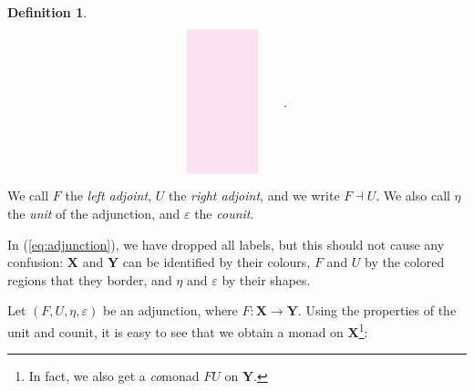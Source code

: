 \documentclass{article}
\numberwithin{equation}{section}
\theoremstyle{definition}
\newtheorem{definition}[theorem]{Definition}
\newcommand{\varcat}[1]{\mathbf{#1}}
\newcommand{\cX}{\varcat{X}}
\newcommand{\cY}{\varcat{Y}}
\begin{document}
\begin{definition}
\begin{equation}
\begin{aligned}
\begin{tikzpicture}[scale=2]
						\fill[very nearly transparent, magenta]									
						(1.5,-1) -- (1.5,-3) --(2.5,-3) -- (2.5,-1);							
					\end{tikzpicture}
				\end{aligned}									
				\qquad.
			\end{equation}
			We call $F$ the \emph{left adjoint}, $U$ the \emph{right adjoint}, and we write $F \dashv U$. We also call $\eta$ the \emph{unit} of the adjunction, and $\varepsilon$ the \emph{counit}.
		\end{definition}
		In (\ref{eq:adjunction}), we have dropped all labels, but this should not cause any confusion: $\cX$ and $\cY$ can be identified by their colours,  $F$ and $U$ by the colored regions that they border, and $\eta$ and $\varepsilon$ by their shapes. 

		Let $(F,U,\eta,\varepsilon)$ be an adjunction, where $F: \cX \to \cY$. Using the properties of the unit and counit, it is easy to see that we obtain a monad on $\cX$\footnote{In fact, we also get a \emph{co}monad $FU$ on $\cY$.}:
\end{document}
